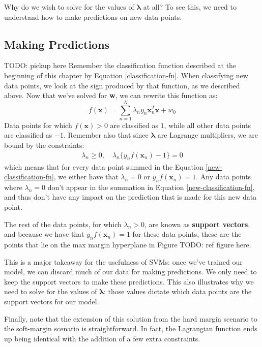 Why do we wish to solve for the values of $\boldsymbol{\lambda}$ at all? To see this, we need to understand how to make predictions on new data points.

\subsection{Making Predictions}
TODO: pickup here
Remember the classification function described at the beginning of this chapter by Equation \ref{classification-fn}. When classifying new data points, we look at the sign produced by that function, as we described above. Now that we've solved for \textbf{w}, we can rewrite this function as:
\begin{equation} \label{new-classification-fn}
	f(\textbf{x}) = \sum_{n=1}^{N} \lambda_{n} y_{n} \textbf{x}_{n}^{T} \textbf{x} + w_{0}
\end{equation}
Data points for which $f(\textbf{x}) > 0$ are classified as $1$, while all other data points are classified as $-1$. Remember also that since $\boldsymbol{\lambda}$ are Lagrange multipliers, we are bound by the constraints:
\begin{align*}
	\lambda_{n} \geq 0, \quad \lambda_{n} \{y_{n} f(\textbf{x}_{n}) - 1\} = 0
\end{align*}
which means that for every data point summed in the Equation \ref{new-classification-fn}, we either have that $\lambda_{n} = 0$ or $y_{n} f(\textbf{x}_{n}) = 1$. Any data points where $\lambda_{n} = 0$ don't appear in the summation in Equation \ref{new-classification-fn}, and thus don't have any impact on the prediction that is made for this new data point. \newline

The rest of the data points, for which $\lambda_{n} > 0$, are known as \textbf{support vectors}, and because we have that $y_{n} f(\textbf{x}_{n}) = 1$ for these data points, these are the points that lie on the max margin hyperplane in Figure TODO: ref figure here.

This is a major takeaway for the usefulness of SVMs: once we've trained our model, we can discard much of our data for making predictions. We only need to keep the support vectors to make these predictions. This also illustrates why we need to solve for the values of $\boldsymbol{\lambda}$: those values dictate which data points are the support vectors for our model.

Finally, note that the extension of this solution from the hard margin scenario to the soft-margin scenario is straightforward. In fact, the Lagrangian function ends up being identical with the addition of a few extra constraints.


